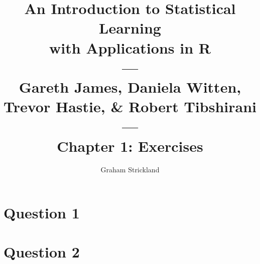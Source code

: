 \documentclass{article}
\title{
    An Introduction to Statistical Learning\\with Applications in R\\---\\
    Gareth James, Daniela Witten, Trevor Hastie, \& Robert Tibshirani\\---\\
    Chapter 1: Exercises
}
\author{Graham Strickland}
\begin{document}
\maketitle  

\section*{Question 1}


\section*{Question 2}

\end{document}
